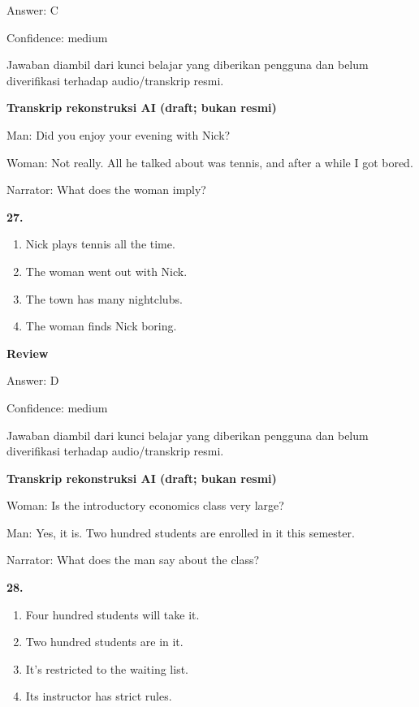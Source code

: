 \documentclass[12pt]{article}
\begin{document}
Answer: C\par
Confidence: medium\par
Jawaban diambil dari kunci belajar yang diberikan pengguna dan belum diverifikasi terhadap audio/transkrip resmi.\par
\endgroup
\par
\vspace{0.25\baselineskip}
\begin{exampleblock}
\textbf{Transkrip rekonstruksi AI (draft; bukan resmi)}\par
Man: Did you enjoy your evening with Nick?\par
Woman: Not really. All he talked about was tennis, and after a while I got bored.\par
Narrator: What does the woman imply?\par
\end{exampleblock}
\noindent\textbf{27.}
\begin{enumerate}[label=(\Alph*),leftmargin=*,itemsep=0.2em]
\item Nick plays tennis all the time.
\item The woman went out with Nick.
\item The town has many nightclubs.
\item The woman finds Nick boring.
\end{enumerate}
\par
\begingroup
\setlength{\parskip}{0pt}
\setlength{\parindent}{0pt}
\textbf{Review}\par
Answer: D\par
Confidence: medium\par
Jawaban diambil dari kunci belajar yang diberikan pengguna dan belum diverifikasi terhadap audio/transkrip resmi.\par
\endgroup
\par
\vspace{0.25\baselineskip}
\begin{exampleblock}
\textbf{Transkrip rekonstruksi AI (draft; bukan resmi)}\par
Woman: Is the introductory economics class very large?\par
Man: Yes, it is. Two hundred students are enrolled in it this semester.\par
Narrator: What does the man say about the class?\par
\end{exampleblock}
\noindent\textbf{28.}
\begin{enumerate}[label=(\Alph*),leftmargin=*,itemsep=0.2em]
\item Four hundred students will take it.
\item Two hundred students are in it.
\item It's restricted to the waiting list.
\item Its instructor has strict rules.
\end{enumerate}
\end{document}
